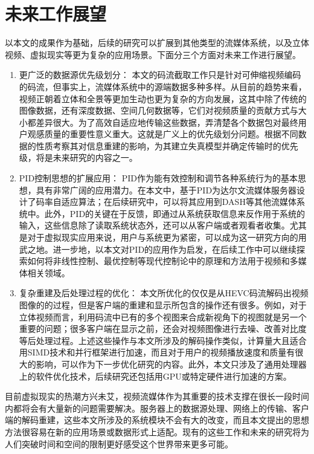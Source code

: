 \section{未来工作展望}

以本文的成果作为基础，后续的研究可以扩展到其他类型的流媒体系统，以及立体视频、虚拟现实等更为复杂的应用场景。下面分三个方面对未来工作进行展望。
\begin{enumerate}
\item {更广泛的数据源优先级划分：}
本文的码流截取工作只是针对可伸缩视频编码的码流，但事实上，流媒体系统中的源端数据多种多样。从目前的趋势来看，视频正朝着立体和全景等更加生动也更为复杂的方向发展，这其中除了传统的图像数据，还有深度数据、空间几何数据等，它们对视频质量的贡献方式与大小都差异很大。为了高效自适应地传输这些数据，弄清楚各个数据包对最终用户观感质量的重要性意义重大。这就是广义上的优先级划分问题。根据不同数据的性质考察其对信息重建的影响，为其建立失真模型并确定传输时的优先级，将是未来研究的内容之一。
\item {PID控制思想的扩展应用：}
PID作为能有效控制和调节各种系统行为的基本思想，具有非常广阔的应用潜力。在本文中，基于PID为达尔文流媒体服务器设计了码率自适应算法；在后续研究中，可以将其应用到DASH等其他流媒体系统中。此外，PID的关键在于反馈，即通过从系统获取信息来反作用于系统的输入，这些信息除了读取系统状态外，还可以从客户端或者观看者收集。尤其是对于虚拟现实应用来说，用户与系统更为紧密，可以成为这一研究方向的用武之地。进一步地，以本文对PID的应用作为启发，在后续工作中可以继续探索如何将非线性控制、最优控制等现代控制论中的原理和方法用于视频和多媒体相关领域。
\item {复杂重建及后处理过程的优化：}
本文所优化的仅仅是从HEVC码流解码出视频图像的的过程，但是客户端的重建和显示所包含的操作还有很多。例如，对于立体视频而言，利用码流中已有的多个视图来合成新视角下的视图就是另一个重要的问题；很多客户端在显示之前，还会对视频图像进行去噪、改善对比度等后处理过程。上述这些操作与本文所涉及的解码操作类似，计算量大且适合用SIMD技术和并行框架进行加速，而且对于用户的视频播放速度和质量有很大的影响，可以作为下一步优化研究的内容。此外，本文只涉及了通用处理器上的软件优化技术，后续研究还包括用GPU或特定硬件进行加速的方案。
\end{enumerate}

目前虚拟现实的热潮方兴未艾，视频流媒体作为其重要的技术支撑在很长一段时间内都将会有大量新的问题需要解决。服务器上的数据源处理、网络上的传输、客户端的解码重建，这些本文所涉及的系统模块不会有大的改变，而且本文提出的思想方法很容易在新的应用场景或数据形式上适配。现有的这些工作和未来的研究将为人们突破时间和空间的限制更好感受这个世界带来更多可能。